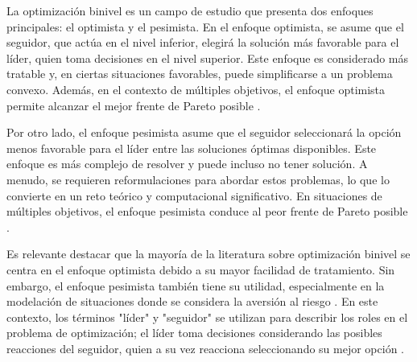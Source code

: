La optimización binivel es un campo de estudio que presenta dos enfoques principales: el optimista y el pesimista. En el enfoque optimista, se asume que el seguidor, que actúa en el nivel inferior, elegirá la solución más favorable para el líder, quien toma decisiones en el nivel superior. Este enfoque es considerado más tratable y, en ciertas situaciones favorables, puede simplificarse a un problema convexo. Además, en el contexto de múltiples objetivos, el enfoque optimista permite alcanzar el mejor frente de Pareto posible \cite{DempeyZemkoho2020}.

Por otro lado, el enfoque pesimista asume que el seguidor seleccionará la opción menos favorable para el líder entre las soluciones óptimas disponibles. Este enfoque es más complejo de resolver y puede incluso no tener solución. A menudo, se requieren reformulaciones para abordar estos problemas, lo que lo convierte en un reto teórico y computacional significativo. En situaciones de múltiples objetivos, el enfoque pesimista conduce al peor frente de Pareto posible \cite{Sinha2017ARO}.

Es relevante destacar que la mayoría de la literatura sobre optimización binivel se centra en el enfoque optimista debido a su mayor facilidad de tratamiento. Sin embargo, el enfoque pesimista también tiene su utilidad, especialmente en la modelación de situaciones donde se considera la aversión al riesgo 
\cite{DempeyZemkoho2020}. En este contexto, los términos "líder" y "seguidor" se utilizan para describir los roles en el problema de optimización; el líder toma decisiones considerando las posibles reacciones del seguidor, quien a su vez reacciona seleccionando su mejor opción \cite{Sinha2017ARO}.


